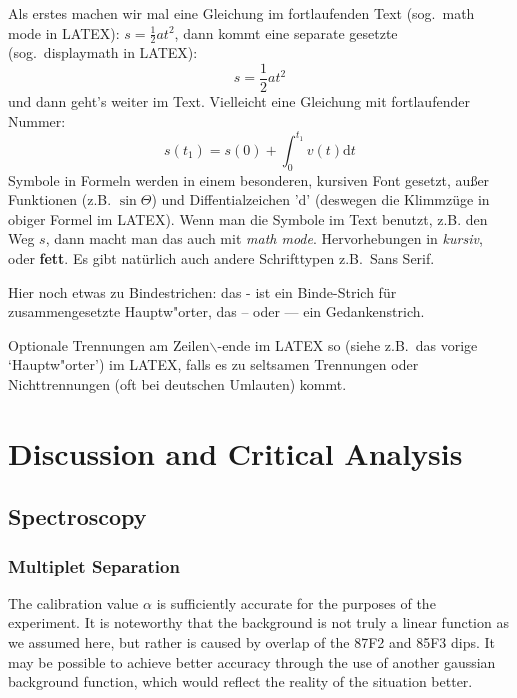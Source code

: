 \documentclass[12pt, a4paper]{article}
\begin{document}
Als erstes machen wir mal eine Gleichung im fortlaufenden Text (sog.\ math mode in LATEX): $s=\frac{1}{2}
a t^2$, dann kommt eine separate gesetzte (sog.\ displaymath in LATEX):
\[         s=\frac{1}{2}a t^2              \]  %
und dann geht's weiter im Text. Vielleicht eine Gleichung mit fortlaufender 
Nummer:
\begin{equation}
 s(t_1)=s(0) + \int_0^{t_1} v(t)\mbox{d}t 
\end{equation}
Symbole in Formeln werden in einem besonderen, kursiven Font
gesetzt, au\ss er Funktionen (z.B. $\sin\Theta$) und Diffentialzeichen 'd' 
(deswegen die Klimmz\"uge in obiger Formel im LATEX). Wenn man die Symbole im
Text benutzt, z.B. den Weg $s$, dann macht man das auch mit {\em math mode}.
Hervorhebungen in {\em kursiv}, oder {\bf fett}. Es gibt nat\"urlich auch 
andere
Schrifttypen z.B.\ {\sf Sans Serif}.

Hier noch etwas zu Bindestrichen: das - ist ein Binde-Strich f\"ur 
zusammengesetzte Haupt\-w"or\-ter, das -- oder --- ein Gedankenstrich. 

Optionale
Trennungen am Zeilen$\backslash$-ende im LATEX so (siehe z.B.\ das vorige 
`Haupt\-w"or\-ter') im LATEX, falls es zu seltsamen
Trennungen oder Nichttrennungen (oft bei deutschen Umlauten) kommt.


















\newpage

\section{Discussion and Critical Analysis}

\subsection{Spectroscopy}
\subsubsection{Multiplet Separation}
The calibration value $\alpha$ is sufficiently accurate for the purposes of the experiment. It is noteworthy that the background is not truly a linear function as we assumed here, but rather is caused by overlap of the 87F2 and 85F3 dips. It may be possible to achieve better accuracy through the use of another gaussian background function, which would reflect the reality of the situation better.
\end{document}
